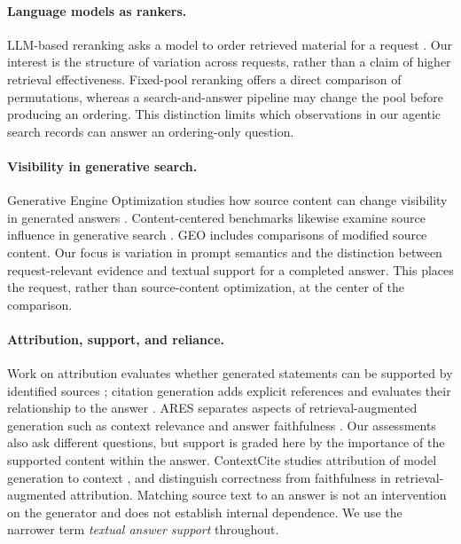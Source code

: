 \paragraph{Language models as rankers.}
LLM-based reranking asks a model to order retrieved material for a request \citep{P041}. Our interest is the structure of variation across requests, rather than a claim of higher retrieval effectiveness. Fixed-pool reranking offers a direct comparison of permutations, whereas a search-and-answer pipeline may change the pool before producing an ordering. This distinction limits which observations in our agentic search records can answer an ordering-only question.

\paragraph{Visibility in generative search.}
Generative Engine Optimization studies how source content can change visibility in generated answers \citep{P044}. Content-centered benchmarks likewise examine source influence in generative search \citep{A002}. GEO includes comparisons of modified source content. Our focus is variation in prompt semantics and the distinction between request-relevant evidence and textual support for a completed answer. This places the request, rather than source-content optimization, at the center of the comparison.

\paragraph{Attribution, support, and reliance.}
Work on attribution evaluates whether generated statements can be supported by identified sources \citep{P072}; citation generation adds explicit references and evaluates their relationship to the answer \citep{P074}. ARES separates aspects of retrieval-augmented generation such as context relevance and answer faithfulness \citep{P083}. Our assessments also ask different questions, but support is graded here by the importance of the supported content within the answer. ContextCite studies attribution of model generation to context \citep{P068}, and \citet{A006} distinguish correctness from faithfulness in retrieval-augmented attribution. Matching source text to an answer is not an intervention on the generator and does not establish internal dependence. We use the narrower term \emph{textual answer support} throughout.
